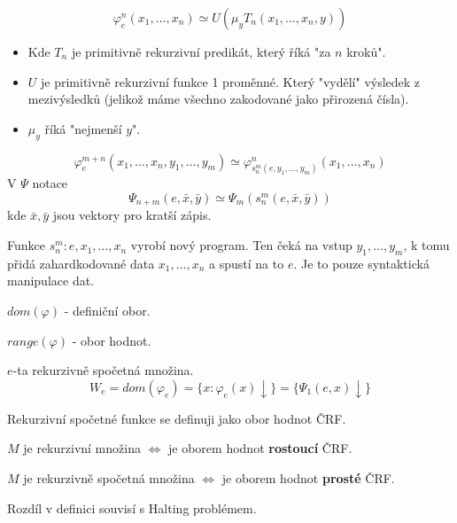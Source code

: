 \begin{notation}
	\[ \varphi_e^n(x_1, \ldots, x_n) \simeq U(\mu_y T_n(x_1, \ldots, x_n, y)) \]

	\begin{itemize}
		\item Kde $T_n$ je primitivně rekurzivní predikát, který říká "za $n$ kroků".
		\item $U$ je primitivně rekurzivní funkce 1 proměnné.
			Který "vydělí" výsledek z mezivýsledků (jelikož máme všechno zakodované jako přirozená čísla).
		\item $\mu_y$ říká "nejmenší $y$".
	\end{itemize}
\end{notation}

\begin{theorem}[s-m-n (BD)]\label{s_m_n}
	\[ \varphi_e^{m + n}(x_1, \ldots, x_n, y_1, \ldots, y_m) \simeq \varphi_{s_n^m(e, y_1, \ldots, y_m)}^n(x_1, \ldots, x_n) \]
	V $\Psi$ notace
	\[ \Psi_{n + m}(e, \bar{x}, \bar{y}) \simeq \Psi_m(s_n^m(e, \bar{x}, \bar{y})) \]
	kde $\bar{x}, \bar{y}$ jsou vektory pro kratší zápis.

	Funkce $s_n^m: e, x_1, \ldots, x_n$ vyrobí nový program.
	Ten čeká na vstup $y_1, \ldots, y_m$, k tomu přidá zahardkodované data $x_1, \ldots, x_n$ a spustí na to $e$.
	Je to pouze syntaktická manipulace dat.
\end{theorem}

\begin{notation}
	$dom(\varphi)$ - definiční obor.
\end{notation}
\begin{notation}
	$range(\varphi)$ - obor hodnot.
\end{notation}

\begin{definition}
	$e$-ta rekurzivně spočetná množina.
	\[ W_e = dom(\varphi_e) = \{ x: \varphi_e(x) \downarrow \} = \{ \Psi_1(e, x) \downarrow \} \]
\end{definition}

\begin{note}
	Rekurzivní spočetné funkce se definuji jako obor hodnot ČRF.

	$M$ je rekurzivní množina $\iff$ je oborem hodnot \textbf{rostoucí} ČRF.

	$M$ je rekurzivně spočetná množina $\iff$ je oborem hodnot \textbf{prosté} ČRF.

	Rozdíl v definici souvisí s Halting problémem.
\end{note}

